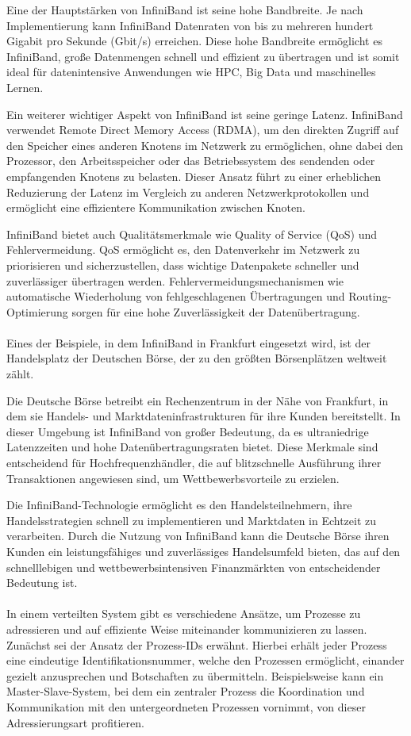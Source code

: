 Eine der Hauptstärken von InfiniBand ist seine hohe Bandbreite. Je nach Implementierung kann InfiniBand Datenraten von bis zu mehreren hundert Gigabit pro Sekunde (Gbit/s) erreichen. Diese hohe Bandbreite ermöglicht es InfiniBand, große Datenmengen schnell und effizient zu übertragen und ist somit ideal für datenintensive Anwendungen wie HPC, Big Data und maschinelles Lernen.

Ein weiterer wichtiger Aspekt von InfiniBand ist seine geringe Latenz. InfiniBand verwendet Remote Direct Memory Access (RDMA), um den direkten Zugriff auf den Speicher eines anderen Knotens im Netzwerk zu ermöglichen, ohne dabei den Prozessor, den Arbeitsspeicher oder das Betriebssystem des sendenden oder empfangenden Knotens zu belasten. Dieser Ansatz führt zu einer erheblichen Reduzierung der Latenz im Vergleich zu anderen Netzwerkprotokollen und ermöglicht eine effizientere Kommunikation zwischen Knoten.

InfiniBand bietet auch Qualitätsmerkmale wie Quality of Service (QoS) und Fehlervermeidung. QoS ermöglicht es, den Datenverkehr im Netzwerk zu priorisieren und sicherzustellen, dass wichtige Datenpakete schneller und zuverlässiger übertragen werden. Fehlervermeidungsmechanismen wie automatische Wiederholung von fehlgeschlagenen Übertragungen und Routing-Optimierung sorgen für eine hohe Zuverlässigkeit der Datenübertragung.
\\\\
Eines der Beispiele, in dem InfiniBand in Frankfurt eingesetzt wird, ist der Handelsplatz der Deutschen Börse, der zu den größten Börsenplätzen weltweit zählt.

Die Deutsche Börse betreibt ein Rechenzentrum in der Nähe von Frankfurt, in dem sie Handels- und Marktdateninfrastrukturen für ihre Kunden bereitstellt. In dieser Umgebung ist InfiniBand von großer Bedeutung, da es ultraniedrige Latenzzeiten und hohe Datenübertragungsraten bietet. Diese Merkmale sind entscheidend für Hochfrequenzhändler, die auf blitzschnelle Ausführung ihrer Transaktionen angewiesen sind, um Wettbewerbsvorteile zu erzielen.

Die InfiniBand-Technologie ermöglicht es den Handelsteilnehmern, ihre Handelsstrategien schnell zu implementieren und Marktdaten in Echtzeit zu verarbeiten. Durch die Nutzung von InfiniBand kann die Deutsche Börse ihren Kunden ein leistungsfähiges und zuverlässiges Handelsumfeld bieten, das auf den schnelllebigen und wettbewerbsintensiven Finanzmärkten von entscheidender Bedeutung ist.
\\\\
In einem verteilten System gibt es verschiedene Ansätze, um Prozesse zu adressieren und auf effiziente Weise miteinander kommunizieren zu lassen. Zunächst sei der Ansatz der Prozess-IDs erwähnt. Hierbei erhält jeder Prozess eine eindeutige Identifikationsnummer, welche den Prozessen ermöglicht, einander gezielt anzusprechen und Botschaften zu übermitteln. Beispielsweise kann ein Master-Slave-System, bei dem ein zentraler Prozess die Koordination und Kommunikation mit den untergeordneten Prozessen vornimmt, von dieser Adressierungsart profitieren.

